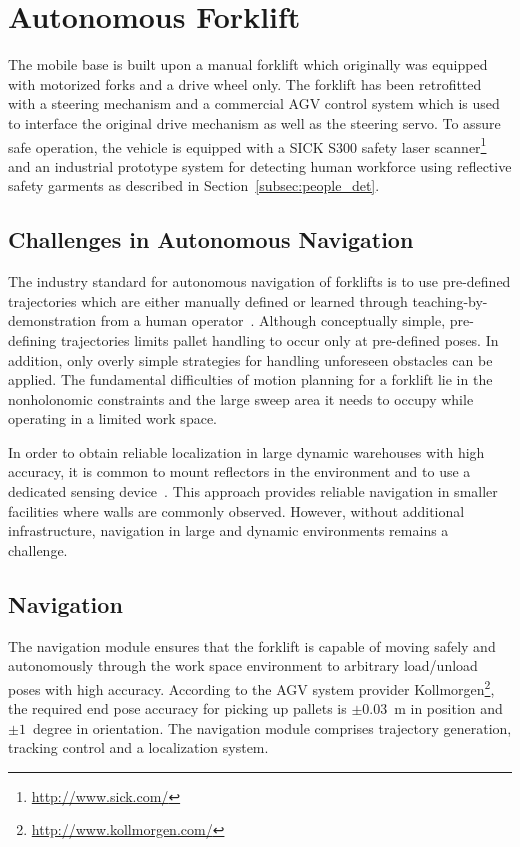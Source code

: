 \section{Autonomous Forklift}
\label{sec:agv}
%
The mobile base is built upon a manual forklift which originally was equipped with motorized forks
and a drive wheel only. The forklift has been retrofitted with a steering mechanism and a commercial
AGV control system which is used to interface the original drive mechanism as well as the steering
servo. To assure safe operation, the vehicle is equipped with a SICK S300 safety laser
scanner\footnote{\url{http://www.sick.com/}} and an industrial prototype system for detecting human
workforce using reflective safety garments as described in Section~\ref{subsec:people_det}.
%
\subsection{Challenges in Autonomous Navigation}
\label{subsec:AGV_challenges}
%
The industry standard for autonomous navigation of forklifts is to use pre-defined trajectories
which are either manually defined or learned through teaching-by-demonstration from a human
operator~\cite{Hell06, Marsh08}. Although conceptually simple, pre-defining trajectories limits
pallet handling to occur only at pre-defined poses. In addition, only overly simple strategies for
handling unforeseen obstacles can be applied. The fundamental difficulties of motion planning for a
forklift lie in the nonholonomic constraints and the large sweep area it needs to occupy while
operating in a limited work space.

In order to obtain reliable localization in large dynamic warehouses with high accuracy, it is
common to mount reflectors in the environment and to use a dedicated sensing
device~\cite{Hyyp89}. This approach provides reliable navigation in smaller facilities where walls
are commonly observed. However, without additional infrastructure, navigation in large and dynamic
environments remains a challenge.
%
\subsection{Navigation}
\label{subsec:navigation}
%
The navigation module ensures that the forklift is capable of moving safely and autonomously through
the work space environment to arbitrary load/unload poses with high accuracy. According to the AGV
system provider Kollmorgen\footnote{\url{http://www.kollmorgen.com/}}, the required end pose
accuracy for picking up pallets is $\pm0.03$~m in position and $\pm1$~degree in orientation. The
navigation module comprises trajectory generation, tracking control and a localization system.
 
